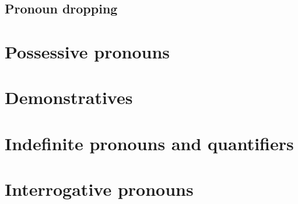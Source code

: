\subsection{Pronoun dropping}

\section{Possessive pronouns}

\section{Demonstratives}

\section{Indefinite pronouns and quantifiers}


\section{Interrogative pronouns}
